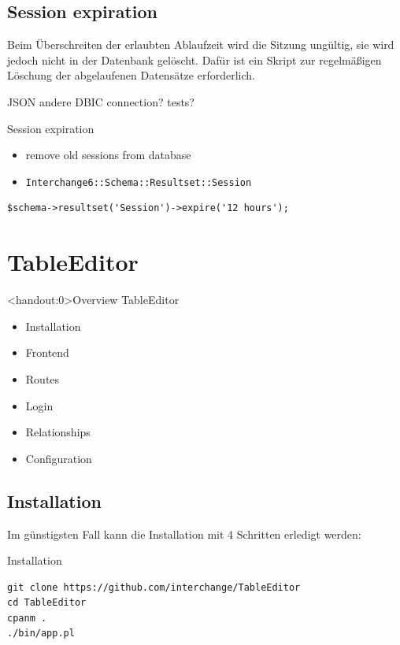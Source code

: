 \subsection{Session expiration}

Beim Überschreiten der erlaubten Ablaufzeit wird die Sitzung
ungültig, sie wird jedoch nicht in der Datenbank gelöscht.
Dafür ist ein Skript zur regelmäßigen Löschung der
abgelaufenen Datensätze erforderlich.

JSON
andere DBIC connection?
tests?

\begin{frame}[fragile]{Session expiration}
\begin{itemize}
\item remove old sessions from database
\item \verb|Interchange6::Schema::Resultset::Session|
\end{itemize}
\begin{lstlisting}
$schema->resultset('Session')->expire('12 hours');
\end{lstlisting}
\end{frame}

\section{TableEditor}

\begin{frame}<handout:0>{Overview TableEditor}
\begin{itemize}
\item Installation
\item Frontend
\item Routes
\item Login
\item Relationships
\item Configuration
\end{itemize}
\end{frame}

\subsection{Installation}
Im günstigsten Fall kann die Installation mit 4 Schritten
erledigt werden:

\begin{frame}[fragile]{Installation}
\begin{lstlisting}
git clone https://github.com/interchange/TableEditor
cd TableEditor
cpanm .
./bin/app.pl
\end{lstlisting}
\end{frame}

